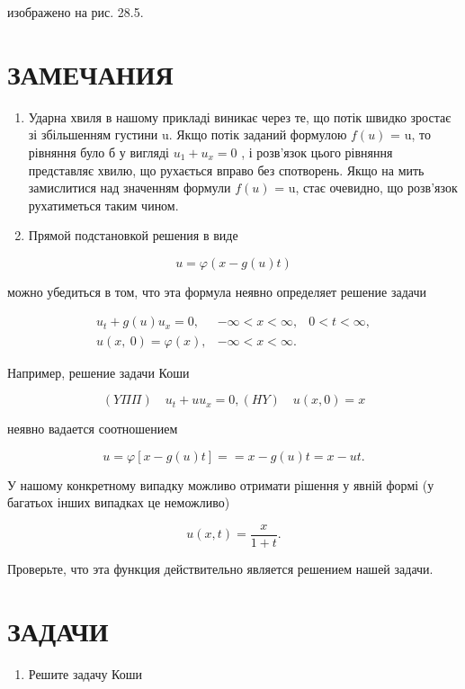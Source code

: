 \documentclass[
  ukrainian,
]{article}
\providecommand{\tightlist}{%
  \setlength{\itemsep}{0pt}\setlength{\parskip}{0pt}}
\begin{document}
изображено на рис. 28.5.

\section{ЗАМЕЧАНИЯ}\label{ux437ux430ux43cux435ux447ux430ux43dux438ux44f-11}

\begin{enumerate}
\def\labelenumi{\arabic{enumi}.}
\item
  Ударна хвиля в нашому прикладі виникає через те, що потік швидко
  зростає зі збільшенням густини u. Якщо потік заданий формулою \(f(u)\)
  = u, то рівняння було б у вигляді \(u_1+u_x=0\) , і розв'язок цього
  рівняння представляє хвилю, що рухається вправо без спотворень. Якщо
  на мить замислитися над значенням формули \(f(u)\) = u, стає очевидно,
  що розв'язок рухатиметься таким чином.
\item
  Прямой подстановкой решения в виде
\end{enumerate}

\[
u = \varphi(x - g(u) t)
\]

можно убедиться в том, что эта формула неявно определяет решение задачи

\[
\begin{array}{lll} u_t + g\left(u\right) u_x = 0, & -\infty < x < \infty, & 0 < t < \infty, \\ u\left(x, \ 0\right) = \varphi\left(x\right), & -\infty < x < \infty. \end{array}
\]

Например, решение задачи Коши

\[
(Y\Pi\Pi) \quad u_t + uu_x = 0,
(HY) \quad u(x, 0) = x
\]

неявно вадается соотношением

\[
u = \varphi [x - g(u) t] =
= x - g(u) t = x - ut.
\]

У нашому конкретному випадку можливо отримати рішення у явній формі (у
багатьох інших випадках це неможливо)

\[
u(x, t) = \frac{x}{1+t}.
\]

Проверьте, что эта функция действительно является решением нашей задачи.

\section{\texorpdfstring{\textbf{ЗАДАЧИ}}{ЗАДАЧИ}}\label{ux437ux430ux434ux430ux447ux438-12}

\begin{enumerate}
\def\labelenumi{\arabic{enumi}.}
\tightlist
\item
  Решите задачу Коши
\end{enumerate}
\end{document}

